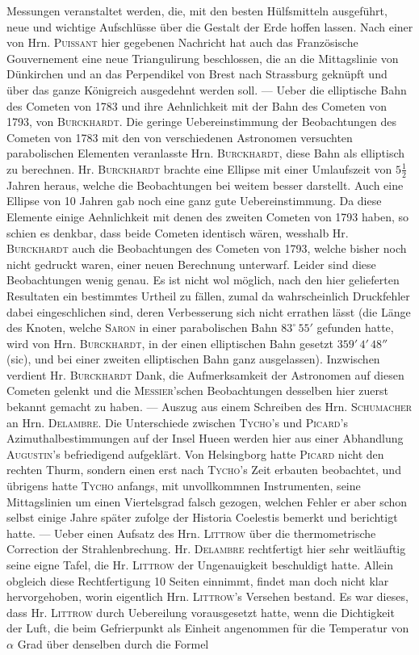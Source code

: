 Messungen veranstaltet werden, die, mit den besten Hülfsmitteln ausgeführt, neue und wichtige Aufschlüsse über die Gestalt der Erde hoffen lassen. Nach einer von Hrn. \textsc{Puissant} hier gegebenen Nachricht hat auch das Französische Gouvernement eine neue Triangulirung beschlossen, die an die Mittagslinie von Dünkirchen und an das Perpendikel von Brest nach Strassburg geknüpft und über das ganze Königreich ausgedehnt werden soll. --- Ueber die elliptische Bahn des Cometen von 1783 und ihre Aehnlichkeit mit der Bahn des Cometen von 1793, von \textsc{Burckhardt}. Die geringe Uebereinstimmung der Beobachtungen des Cometen von 1783 mit den von verschiedenen Astronomen versuchten parabolischen Elementen veranlasste Hrn. \textsc{Burckhardt}, diese Bahn als elliptisch zu berechnen. Hr. \textsc{Burckhardt} brachte eine Ellipse mit einer Umlaufszeit von $5\tfrac{1}{2}$ Jahren heraus, welche die Beobachtungen bei weitem besser darstellt. Auch eine Ellipse von 10 Jahren gab noch eine ganz gute Uebereinstimmung. Da diese Elemente einige Aehnlichkeit mit denen des zweiten Cometen von 1793 haben, so schien es denkbar, dass beide Cometen identisch wären, wesshalb Hr. \textsc{Burckhardt} auch die Beobachtungen des Cometen von 1793, welche bisher noch nicht gedruckt waren, einer neuen Berechnung unterwarf. Leider sind diese Beobachtungen wenig genau. Es ist nicht wol möglich, nach den hier gelieferten Resultaten ein bestimmtes Urtheil zu fällen, zumal da wahrscheinlich Druckfehler dabei eingeschlichen sind, deren Verbesserung sich nicht errathen lässt (die Länge des Knoten, welche \textsc{Saron} in einer parabolischen Bahn $83^\circ\,55'$ gefunden hatte, wird von Hrn. \textsc{Burckhardt}, in der einen elliptischen Bahn gesetzt $359'\,4'\,48''$ (sic), und bei einer zweiten elliptischen Bahn ganz ausgelassen). Inzwischen verdient Hr. \textsc{Burckhardt} Dank, die Aufmerksamkeit der Astronomen auf diesen Cometen gelenkt und die \textsc{Messier}'schen Beobachtungen desselben hier zuerst bekannt gemacht zu haben. --- Auszug aus einem Schreiben des Hrn. \textsc{Schumacher} an Hrn. \textsc{Delambre}. Die Unterschiede zwischen \textsc{Tycho}'s und \textsc{Picard}'s Azimuthalbestimmungen auf der Insel Hueen werden hier aus einer Abhandlung \textsc{Augustin}'s befriedigend aufgeklärt. Von Helsingborg hatte \textsc{Picard} nicht den rechten Thurm, sondern einen erst nach \textsc{Tycho}'s Zeit erbauten beobachtet, und übrigens hatte \textsc{Tycho} anfangs, mit unvollkommnen Instrumenten, seine Mittagslinien um einen Viertelsgrad falsch gezogen, welchen Fehler er aber schon selbst einige Jahre später zufolge der Historia Coelestis bemerkt und berichtigt hatte. --- Ueber einen Aufsatz des Hrn. \textsc{Littrow} über die thermometrische Correction der Strahlenbrechung. Hr. \textsc{Delambre} rechtfertigt hier sehr weitläuftig seine eigne Tafel, die Hr. \textsc{Littrow} der Ungenauigkeit beschuldigt hatte. Allein obgleich diese Rechtfertigung 10 Seiten einnimmt, findet man doch nicht klar hervorgehoben, worin eigentlich Hrn. \textsc{Littrow}'s Versehen bestand. Es war dieses, dass Hr. \textsc{Littrow} durch Uebereilung vorausgesetzt hatte, wenn die Dichtigkeit der Luft, die beim Gefrierpunkt als Einheit angenommen für die Temperatur von $\alpha$ Grad über denselben durch die Formel 
